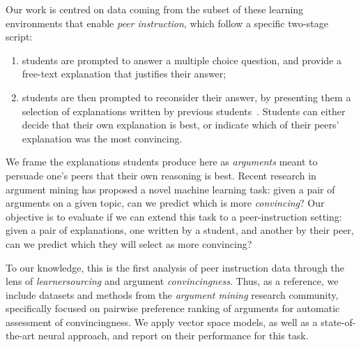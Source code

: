 \documentclass[runningheads]{llncs}
\begin{document}
Our work is centred on data coming from the subset of these learning 
environments that enable \textit{peer instruction}\cite{crouch_peer_2001}, 
which follow a specific two-stage script: 
\begin{enumerate}
	\item students are prompted to answer a multiple choice question, and 
	provide a free-text explanation that justifies their answer;
	\item students are then prompted to reconsider their answer, by presenting 
	them a selection of explanations written by previous 
	students~\cite{bhatnagar_dalite:_2016}.
	Students can either decide that their own explanation is best, or indicate 
	which of their peers' explanation was the most convincing.
\end{enumerate}

We frame the explanations students produce here as \textit{arguments} 
meant to persuade one's peers that their own reasoning is best.
Recent research in argument mining has proposed a novel machine learning task: 
given a pair of arguments on a given topic, can we predict which is more 
\textit{convincing}? \cite{habernal_which_2016} \cite{simpson_finding_2018} 
\cite{toledo_automatic_2019} \cite{gleize_are_2019}
Our objective is to evaluate if we can extend this task to a peer-instruction 
setting: given a pair of explanations, one written by a student, and another by 
their peer, can we predict which they will select as more convincing?


To our knowledge, this is the first analysis of peer instruction data through 
the lens of \textit{learnersourcing} and argument \textit{convincingness}.
Thus, as a reference, we include datasets and methods from the \textit{argument 
mining} research community, specifically focused on pairwise preference ranking 
of arguments for automatic assessment of convincingness.
We apply vector space models, as well as a state-of-the-art neural approach, 
and report on their performance for this task.
\end{document}
